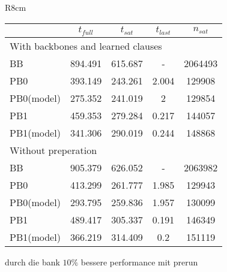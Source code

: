 \begin{wraptable}{R}{8cm}
\begin{tabular}{l | c c c c}
 & $t_{full}$ & $t_{sat}$ & $t_{last}$& $n_{sat}$\\
\hline
\multicolumn{5}{l}{With backbones and learned clauses}\\
BB & 894.491 & 615.687 & - & 2064493\\
PB0 & 393.149 & 243.261 & 2.004 & 129908\\
PB0(model) & 275.352 & 241.019 & 2 & 129854\\
PB1 & 459.353 & 279.284 & 0.217 & 144057\\
PB1(model) & 341.306 & 290.019 & 0.244 & 148868\\
\hline 
\multicolumn{3}{l}{Without preperation}\\
BB & 905.379 & 626.052 & - & 2063982\\
PB0 & 413.299 & 261.777 & 1.985 & 129943\\
PB0(model) & 293.795 & 259.836 & 1.957 & 130099\\
PB1 & 489.417 & 305.337 & 0.191 & 146349\\
PB1(model) & 366.219 & 314.409 & 0.2 & 151119\\
\hline
\end{tabular}
\end{wraptable}

durch die bank $10\%$ bessere performance mit prerun
